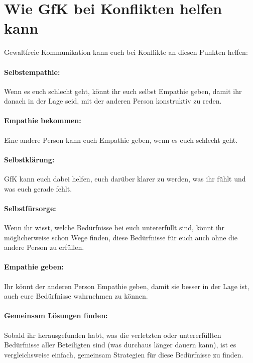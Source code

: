 \section{Wie GfK bei Konflikten helfen kann}
\label{gfk-und-konflikte}

Gewaltfreie Kommunikation kann euch bei Konflikte an diesen Punkten helfen:

\paragraph{Selbstempathie:} Wenn es euch schlecht geht, könnt ihr euch selbst Empathie geben, damit ihr danach in der Lage seid, mit der anderen Person konstruktiv zu reden.

\paragraph{Empathie bekommen:} Eine andere Person kann euch Empathie geben, wenn es euch schlecht geht.

\paragraph{Selbstklärung:} GfK kann euch dabei helfen, euch darüber klarer zu werden, was ihr fühlt und was euch gerade fehlt.

\paragraph{Selbstfürsorge:} Wenn ihr wisst, welche Bedürfnisse bei euch untererfüllt sind, könnt ihr möglicherweise schon Wege finden, diese Bedürfnisse für euch auch ohne die andere Person zu erfüllen.

\paragraph{Empathie geben:} Ihr könnt der anderen Person Empathie geben, damit sie besser in der Lage ist, auch eure Bedürfnisse wahrnehmen zu können.

\paragraph{Gemeinsam Lösungen finden:} Sobald ihr herausgefunden habt, was die verletzten oder untererfüllten Bedürfnisse aller Beteiligten sind (was durchaus länger dauern kann), ist es vergleichsweise einfach, gemeinsam Strategien für diese Bedürfnisse zu finden.
